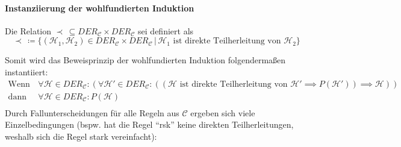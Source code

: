 \documentclass[a4paper, 11pt, accentcolor = tud3b]{tudreport}
\newcommand{\forwhich}{\ensuremath{{\,\vert\,}}}
\begin{document}
				    \paragraph{Instanziierung der wohlfundierten Induktion}
					    Die Relation $ \prec \,\subseteq \textit{DER} _ \mathcal{C} \times \textit{DER} _ \mathcal{C} $ sei definiert als \[ \prec \,\coloneqq \{ (\mathcal{H} _ 1, \mathcal{H _ 2}) \in \textit{DER} _ \mathcal{C} \times \textit{DER} _ \mathcal{C} \forwhich \mathcal{H} _ 1 \text{ ist direkte Teilherleitung von } \mathcal{H} _ 2 \} \]
					    
					    Somit wird das Beweisprinzip der wohlfundierten Induktion folgendermaßen instantiiert:
					    \begin{align*}
						    \text{Wenn gilt:} & \,\forall \mathcal{H} \in \textit{DER} _ \mathcal{C} : (\forall \mathcal{H}' \in \textit{DER} _ \mathcal{C} : ((\mathcal{H} \text{ ist direkte Teilherleitung von } \mathcal{H}' \implies P(\mathcal{H}')) \implies \mathcal{H})) \\
						    \text{dann gilt:} & \,\forall \mathcal{H} \in \textit{DER} _ \mathcal{C} : P(\mathcal{H}) \\
					    \end{align*}
					    Durch Fallunterscheidungen für alle Regeln aus $ \mathcal{C} $ ergeben sich viele Einzelbedingungen (bspw. hat die Regel \enquote{rsk} keine direkten Teilherleitungen, weshalb sich die Regel stark vereinfacht):
\end{document}
